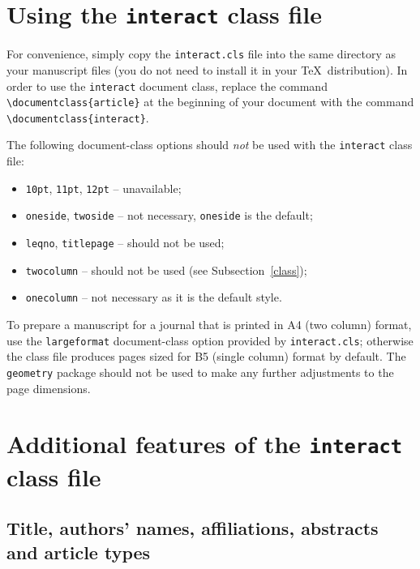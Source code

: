 \documentclass[]{interact}
\theoremstyle{plain}%
\theoremstyle{definition}
\theoremstyle{remark}
\begin{document}
\section{Using the \texttt{interact} class file}

For convenience, simply copy the \texttt{interact.cls} file into the same directory as your manuscript files (you do not need to install it in your \TeX\ distribution).
In order to use the \texttt{interact} document class, replace the command \verb"\documentclass{article}" at the beginning of your document with the command \verb"\documentclass{interact}".

The following document-class options should \emph{not} be used with the \texttt{interact} class file:
\begin{itemize}
  \item \texttt{10pt}, \texttt{11pt}, \texttt{12pt} -- unavailable;
  \item \texttt{oneside}, \texttt{twoside} -- not necessary, \texttt{oneside} is the default;
  \item \texttt{leqno}, \texttt{titlepage} -- should not be used;
  \item \texttt{twocolumn} -- should not be used (see Subsection~\ref{class});
  \item \texttt{onecolumn} -- not necessary as it is the default style.
\end{itemize}
To prepare a manuscript for a journal that is printed in A4 (two column) format, use the \verb"largeformat" document-class option provided by \texttt{interact.cls}; otherwise the class file produces pages sized for B5 (single column) format by default. The \texttt{geometry} package should not be used to make any further adjustments to the page dimensions.


\section{Additional features of the \texttt{interact} class file}

\subsection{Title, authors' names, affiliations, abstracts and article types}
\end{document}
